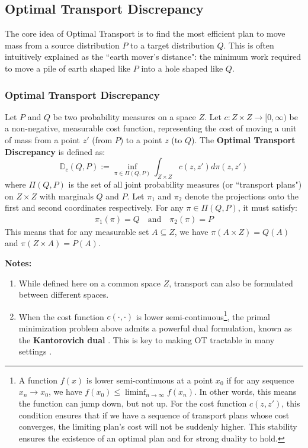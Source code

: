 \documentclass[12pt]{report}
\newcommand{\coloneqq}{\mathrel{:=}}
\begin{document}
\subsection{Optimal Transport Discrepancy}

The core idea of Optimal Transport is to find the most efficient plan to move mass from a source distribution $P$ to a target distribution $Q$. 
This is often intuitively explained as the ``earth mover's distance": the minimum work required to move a pile of earth shaped like $P$ into a hole shaped like $Q$.

\subsubsection*{Optimal Transport Discrepancy}
Let $P$ and $Q$ be two probability measures on a space $Z$. Let $c: Z \times Z \to [0, \infty)$ be a non-negative, measurable cost function, 
representing the cost of moving a unit of mass from a point $z'$ (from $P$) to a point $z$ (to $Q$). 
The \textbf{Optimal Transport Discrepancy} is defined as:
\[
\mathbb{D}_c(Q, P) \coloneqq \inf_{\pi \in \Pi(Q, P)} \int_{Z \times Z} c(z, z') d\pi(z, z')
\]
where $\Pi(Q, P)$ is the set of all joint probability measures (or ``transport plans") on $Z \times Z$ with marginals $Q$ and $P$. 
Let $\pi_1$ and $\pi_2$ denote the projections onto the first and second coordinates respectively. For any $\pi \in \Pi(Q, P)$, it must satisfy:
\begin{align*}
\pi_1(\pi) = Q \quad \text{and} \quad \pi_2(\pi) = P
\end{align*}
This means that for any measurable set $A \subseteq Z$, we have $\pi(A \times Z) = Q(A)$ and $\pi(Z \times A) = P(A)$.

\noindent\textbf{Notes:}
\begin{enumerate}
    \item While defined here on a common space $Z$, transport can also be formulated between different spaces.
    \item When the cost function $c(\cdot, \cdot)$ is lower semi-continuous\footnote{A function $f(x)$ is lower semi-continuous at a point 
    $x_0$ if for any sequence $x_n \to x_0$, we have $f(x_0) \le \liminf_{n\to\infty} f(x_n)$. 
    In other words, this means the function can jump down, but not up. For the cost function $c(z, z')$, 
    this condition ensures that if we have a sequence of transport plans whose cost converges, the limiting plan's cost will not be suddenly higher. 
    This stability ensures the existence of an optimal plan and for strong duality to hold.}, the primal minimization problem above admits a powerful dual formulation, 
    known as the \textbf{Kantorovich dual} \cite{kantorovich2006translocation}. 
    This is key to making OT tractable in many settings \cite{peyre2019computational}.
\end{enumerate}
\end{document}
